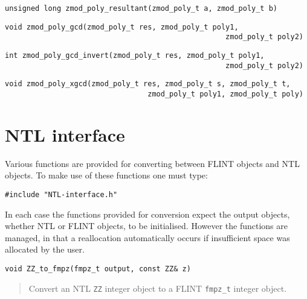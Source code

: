 \documentclass[a4paper,10pt]{article}
\newcommand{\code}{\lstinline}
\begin{document}
\begin{lstlisting}
unsigned long zmod_poly_resultant(zmod_poly_t a, zmod_poly_t b)
\end{lstlisting}
\begin{quote}
\end{quote}

\begin{lstlisting}
void zmod_poly_gcd(zmod_poly_t res, zmod_poly_t poly1, 
                                                   zmod_poly_t poly2)
\end{lstlisting}
\begin{quote}
\end{quote}

\begin{lstlisting}
int zmod_poly_gcd_invert(zmod_poly_t res, zmod_poly_t poly1, 
                                                   zmod_poly_t poly2)
\end{lstlisting}
\begin{quote}
\end{quote}

\begin{lstlisting}
void zmod_poly_xgcd(zmod_poly_t res, zmod_poly_t s, zmod_poly_t t,  
                                 zmod_poly_t poly1, zmod_poly_t poly)
\end{lstlisting}
\begin{quote}
\end{quote}

\section{NTL interface}
Various functions are provided for converting between FLINT objects and NTL objects. To make use of these functions one must type:

\code{#include "NTL-interface.h"}

In each case the functions provided for conversion expect the output objects, whether NTL or FLINT objects, to be initialised. However the functions are managed, in that a reallocation automatically occurs if insufficient space was allocated by the user.

\begin{lstlisting}
void ZZ_to_fmpz(fmpz_t output, const ZZ& z)
\end{lstlisting}
\begin{quote}
Convert an NTL \code{ZZ} integer object to a FLINT \code{fmpz_t} integer object.
\end{quote}
\end{document}
